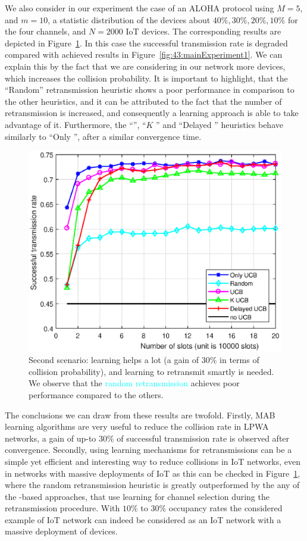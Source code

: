 We also consider in our experiment the case of an ALOHA protocol using $M=5$, and $m=10$, a statistic distribution of the devices about $40\%, 30\%, 20\%, 10\%$ for the four channels, and $N=2000$ IoT devices.
The corresponding results are depicted in Figure~\ref{fig:43:mainExperiment2}.
In this case the successful transmission rate is degraded compared with achieved results in Figure~\ref{fig:43:mainExperiment1}.
We can explain this by the fact that we are considering in our network more devices, which increases the collision probability.
It is important to highlight, that the ``Random'' retransmission heuristic shows a poor performance in comparison to the other heuristics, and it can be attributed to the fact that the number of retransmission is increased, and consequently a
learning approach is able to take advantage of it.
Furthermore, the ``\UCB'', ``$K$ \UCB'' and ``Delayed \UCB'' heuristics behave similarly to ``Only \UCB'', after a similar convergence time.

\begin{figure}[h!]  %
	\centering
	\includegraphics[width=0.80\linewidth]{ResultsUCB2.eps}
	\caption[First comparison between the exposed heuristics for the retransmission: Only \UCB, Random, \UCB, $K$ \UCB, and Delayed \UCB]{
		Second scenario: learning helps a lot (a gain of $30\%$ in terms of collision probability), and learning to retransmit smartly is needed.
		We observe that the \textcolor{cyan}{random retransmission} achieves poor performance compared to the others.
	}
	\label{fig:43:mainExperiment2}
\end{figure}

The conclusions we can draw from these results are twofold.
Firstly, MAB learning algorithms are very useful to reduce the collision rate in LPWA networks, a gain of up-to $30\%$ of successful transmission rate is observed after convergence.
Secondly, using learning mechanisms for retransmissions can be a simple yet efficient and interesting way to reduce collisions in IoT networks, even in networks with massive deployments of IoT as this can be checked in Figure~\ref{fig:43:mainExperiment2}, where the random retransmission heuristic is greatly outperformed by the any of the \UCB-based approaches, that use learning for channel selection during the retransmission procedure.
With $10\%$ to $30\%$ occupancy rates the considered example of IoT network can indeed be considered as an IoT network with a massive deployment of devices.



